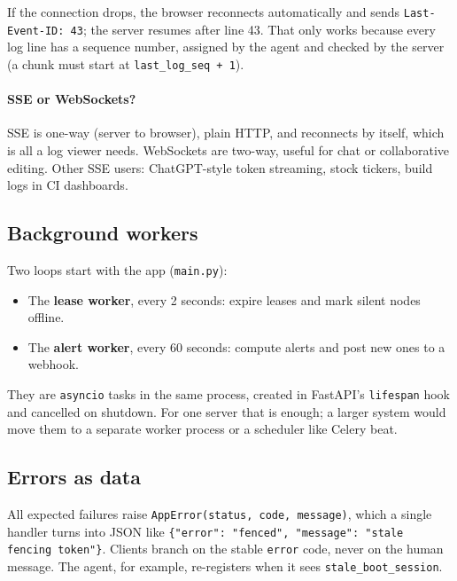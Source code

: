 If the connection drops, the browser reconnects automatically and sends
\texttt{Last-Event-ID: 43}; the server resumes after line 43. That only works
because every log line has a sequence number, assigned by the agent and checked
by the server (a chunk must start at \texttt{last\_log\_seq + 1}).

\paragraph{SSE or WebSockets?} SSE is one-way (server to browser), plain HTTP,
and reconnects by itself, which is all a log viewer needs. WebSockets are
two-way, useful for chat or collaborative editing. Other SSE users: ChatGPT-style
token streaming, stock tickers, build logs in CI dashboards.

\subsection{Background workers}

Two loops start with the app (\texttt{main.py}):

\begin{itemize}
\item The \textbf{lease worker}, every 2 seconds: expire leases and mark silent
  nodes offline.
\item The \textbf{alert worker}, every 60 seconds: compute alerts and post new
  ones to a webhook.
\end{itemize}

They are \texttt{asyncio} tasks in the same process, created in FastAPI's
\texttt{lifespan} hook and cancelled on shutdown. For one server that is enough;
a larger system would move them to a separate worker process or a scheduler
like Celery beat.

\subsection{Errors as data}

All expected failures raise \texttt{AppError(status, code, message)}, which a
single handler turns into JSON like
\texttt{\{"error": "fenced", "message": "stale fencing token"\}}. Clients
branch on the stable \texttt{error} code, never on the human message. The agent,
for example, re-registers when it sees \texttt{stale\_boot\_session}.
